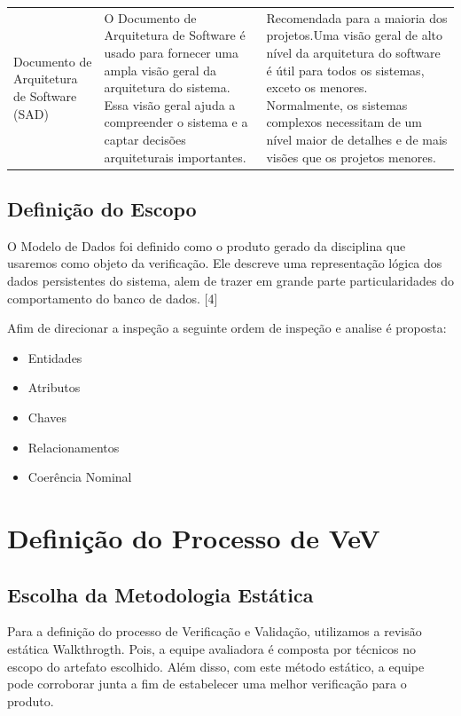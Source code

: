 \begin{table}[]
\begin{tabular}{lll}
Documento de Arquitetura de Software (SAD)         & O Documento de Arquitetura de Software é usado para fornecer uma ampla visão geral da arquitetura do sistema. Essa visão geral ajuda a compreender o sistema e a captar decisões arquiteturais importantes.                                                                                                                                                                                                       & Recomendada para a maioria dos projetos.Uma visão geral de alto nível da arquitetura do software é útil para todos os sistemas, exceto os menores. Normalmente, os sistemas complexos necessitam de um nível maior de detalhes e de mais visões que os projetos menores.                                                                                                        
\end{tabular}
\end{table}

\subsection{Definição do Escopo}
O Modelo de Dados foi definido como o produto gerado da disciplina que usaremos como objeto da verificação. Ele descreve uma representação lógica dos dados persistentes do sistema, alem de trazer em grande parte particularidades do comportamento do banco de dados. [4]

Afim de direcionar a inspeção a seguinte ordem de inspeção e analise é proposta:

\begin{itemize}
\item Entidades
\item Atributos
\item Chaves
\item Relacionamentos
\item Coerência Nominal
\end{itemize}

\section{Definição do Processo de VeV}

\subsection{Escolha da Metodologia Estática}
Para a definição do processo de Verificação e Validação, utilizamos a revisão
estática Walkthrogth. Pois,  a equipe avaliadora é composta por técnicos no escopo
do artefato escolhido. Além disso, com este método estático, a equipe pode corroborar
junta a fim de estabelecer uma melhor verificação para o produto.

